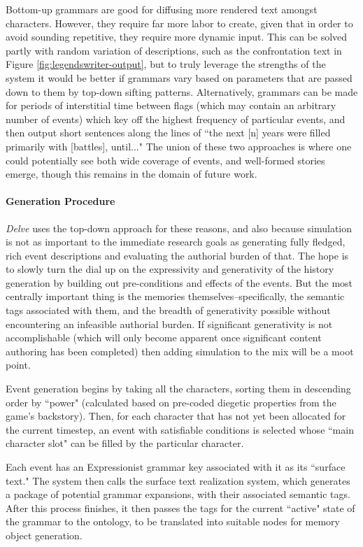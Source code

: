 Bottom-up grammars are good for diffusing more rendered text amongst characters. However, they require far more labor to create, given that in order to avoid sounding repetitive, they require more dynamic input. This can be solved partly with random variation of descriptions, such as the confrontation text in Figure \ref{fig:legendswriter-output}, but to truly leverage the strengths of the system it would be better if grammars vary based on parameters that are passed down to them by top-down sifting patterns. Alternatively, grammars can be made for periods of interstitial time between flags (which may contain an arbitrary number of events) which key off the highest frequency of particular events, and then output short sentences along the lines of ``the next [n] years were filled primarily with [battles], until..." The union of these two approaches is where one could potentially see both wide coverage of events, and well-formed stories emerge, though this remains in the domain of future work.

\paragraph{Generation Procedure}\label{par:delve-generation-procedure}

\textit{Delve} uses the top-down approach for these reasons, and also because simulation is not as important to the immediate research goals as generating fully fledged, rich event descriptions and evaluating the authorial burden of that. The hope is to slowly turn the dial up on the expressivity and generativity of the history generation by building out pre-conditions and effects of the events. But the most centrally important thing is the memories themselves–specifically, the semantic tags associated with them, and the breadth of generativity possible without encountering an infeasible authorial burden. If significant generativity is not accomplishable (which will only become apparent once significant content authoring has been completed) then adding simulation to the mix will be a moot point.

Event generation begins by taking all the characters, sorting them in descending order by ``power" (calculated based on pre-coded diegetic properties from the game's backstory). Then, for each character that has not yet been allocated for the current timestep, an event with satisfiable conditions is selected whose ``main character slot" can be filled by the particular character.

Each event has an Expressionist grammar key associated with it as its ``surface text." The system then calls the surface text realization system, which generates a package of potential grammar expansions, with their associated semantic tags. After this process finishes, it then passes the tags for the current ``active" state of the grammar to the ontology, to be translated into suitable nodes for memory object generation.

